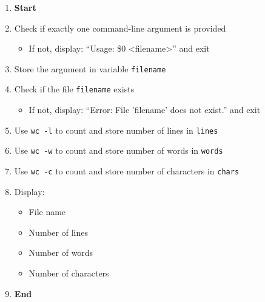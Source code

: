 \begin{enumerate}
    \item \textbf{Start}
    \item Check if exactly one command-line argument is provided
    \begin{itemize}
        \item If not, display: ``Usage: \$0 <filename>'' and exit
    \end{itemize}
    \item Store the argument in variable \texttt{filename}
    \item Check if the file \texttt{filename} exists
    \begin{itemize}
        \item If not, display: ``Error: File 'filename' does not exist.'' and exit
    \end{itemize}
    \item Use \texttt{wc -l} to count and store number of lines in \texttt{lines}
    \item Use \texttt{wc -w} to count and store number of words in \texttt{words}
    \item Use \texttt{wc -c} to count and store number of characters in \texttt{chars}
    \item Display:
    \begin{itemize}
        \item File name
        \item Number of lines
        \item Number of words
        \item Number of characters
    \end{itemize}
    \item \textbf{End}
\end{enumerate}
